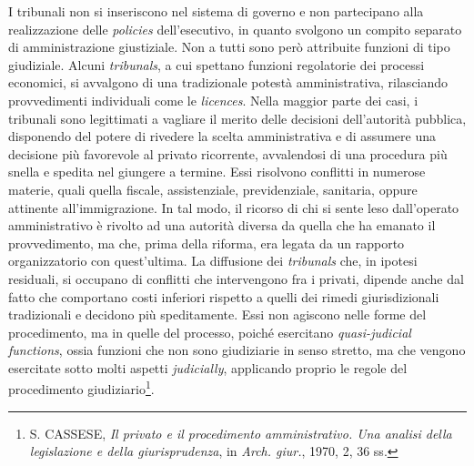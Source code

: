 \documentclass[12pt,it,a4paper,]{report}
\begin{document}
I tribunali non si inseriscono nel sistema di governo e non partecipano
alla realizzazione delle \emph{policies} dell'esecutivo, in quanto
svolgono un compito separato di amministrazione giustiziale. Non a tutti
sono però attribuite funzioni di tipo giudiziale. Alcuni
\emph{tribunals}, a cui spettano funzioni regolatorie dei processi
economici, si avvalgono di una tradizionale potestà amministrativa,
rilasciando provvedimenti individuali come le \emph{licences}. Nella
maggior parte dei casi, i tribunali sono legittimati a vagliare il
merito delle decisioni dell'autorità pubblica, disponendo del potere di
rivedere la scelta amministrativa e di assumere una decisione più
favorevole al privato ricorrente, avvalendosi di una procedura più
snella e spedita nel giungere a termine. Essi risolvono conflitti in
numerose materie, quali quella fiscale, assistenziale, previdenziale,
sanitaria, oppure attinente all'immigrazione. In tal modo, il ricorso di
chi si sente leso dall'operato amministrativo è rivolto ad una autorità
diversa da quella che ha emanato il provvedimento, ma che, prima della
riforma, era legata da un rapporto organizzatorio con quest'ultima. La
diffusione dei \emph{tribunals} che, in ipotesi residuali, si occupano
di conflitti che intervengono fra i privati, dipende anche dal fatto che
comportano costi inferiori rispetto a quelli dei rimedi giurisdizionali
tradizionali e decidono più speditamente. Essi non agiscono nelle forme
del procedimento, ma in quelle del processo, poiché esercitano
\emph{quasi-judicial functions}, ossia funzioni che non sono giudiziarie
in senso stretto, ma che vengono esercitate sotto molti aspetti
\emph{judicially}, applicando proprio le regole del procedimento
giudiziario\footnote{S. CASSESE, \emph{Il privato e il procedimento
  amministrativo. Una analisi della legislazione e della
  giurisprudenza}, in \emph{Arch. giur.}, 1970, 2, 36 ss.}.
\end{document}
